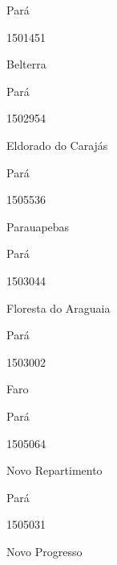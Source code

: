 \documentclass[
  letterpaper,
]{report}
\begin{document}
Pará

\n      

1501451

\n      

Belterra

\n    

\n    

\n      

Pará

\n      

1502954

\n      

Eldorado do Carajás

\n    

\n    

\n      

Pará

\n      

1505536

\n      

Parauapebas

\n    

\n    

\n      

Pará

\n      

1503044

\n      

Floresta do Araguaia

\n    

\n    

\n      

Pará

\n      

1503002

\n      

Faro

\n    

\n    

\n      

Pará

\n      

1505064

\n      

Novo Repartimento

\n    

\n    

\n      

Pará

\n      

1505031

\n      

Novo Progresso
\end{document}
